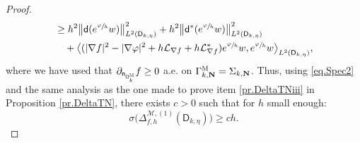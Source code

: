 \documentclass[JEP,XML,SOM,Unicode,NoEqCountersInSection,NoFloatCountersInSection,published]{cedram}
\newcommand{\mbf}[1]{\mathbf{#1}}
\theoremstyle{plain}
\theoremstyle{definition}
\begin{document}
\begin{proof}
\begin{equation}
\begin{aligned}
&\ge
h^{2}\big \| \mathsf d (e^{\sfrac{\varphi}{h}} w)\big \|^{2}_{ L^{2} (\mathsf D_{k,\eta})}+
h^{2} \big \| \mathsf d^{*} (e^{\sfrac{\varphi}{h}} w) \big \|^{2}_{ L^{2} (\mathsf D_{k,\eta})}\\
&\quad + \big \langle
(|\nabla f|^{2}-|\nabla \varphi|^{2}+h\mathcal{L}_{\nabla
f}+h\mathcal{L}_{\nabla
f}^{*})e^{\sfrac{\varphi}{h}} w, e^{\sfrac{\varphi}{h}}
w\big \rangle_{ L^{2} (\mathsf D_{k,\eta})},
\end{aligned}
\end{equation}
where we have used that $\partial_{\mathsf n_{ \mathsf \Omega_k^{\textsc{M}} } }f\ge 0$ a.e. on $\Gamma_{k,\mbf N}^{\textsc{M}}=\Sigma_{k,\mbf N}$.
Thus, using \eqref{eq.Spec2} and the same analysis as the one made to prove item \eqref{pr.DeltaTNiii} in Proposition \ref{pr.DeltaTN}, there exists $c>0$ such that for $h$ small enough:
\begin{equation}\label{eq.Spec1}
\sigma \bigl(\Delta_{f,h}^{ \mathcal M,(1)} (\mathsf D_{k,\eta})\bigr)\ge ch.
\end{equation}


\end{proof}
\end{document}

